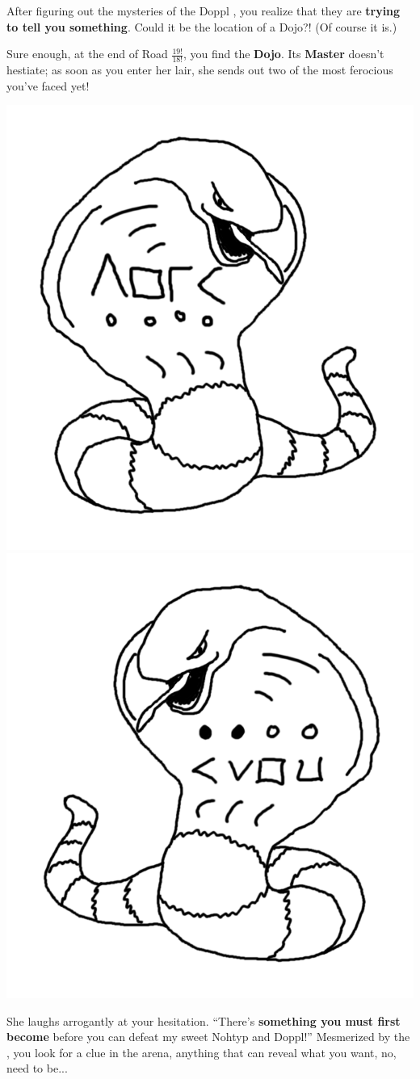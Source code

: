 

After figuring out the mysteries of the Doppl \mappMobidash{}, you realize
that they are \textbf{trying to tell you something}. Could it be the location of
a \mappMobidot{} Dojo?! (Of course it is.)

Sure enough, at the end of Road \(\frac{19!}{18!}\), you find the \textbf{Dojo}.
Its \textbf{Master} doesn't hestiate; as soon as you enter her lair,
she sends out two of the most ferocious \mappMobidot{} you've faced yet!

\begin{center}
\includegraphics[width=0.4\linewidth]{assets/not-arbok-1.png}
\includegraphics[width=0.4\linewidth]{assets/not-arbok-2.png}
\end{center}

She laughs arrogantly at your hesitation.  ``There's \textbf{something you must
  first become} before you can defeat my sweet Nohtyp and Doppl!'' Mesmerized by
the \mappMobidot{} , you look for a clue in the arena, anything that can reveal
what you want, no, need to be...


